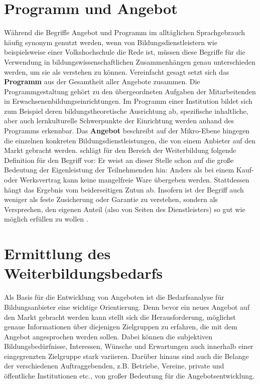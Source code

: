 \documentclass[
  twoside,
  parskip=half-,
  paper=176mm:246mm,
  BCOR=14mm,
  DIV=14,
]{scrreprt}
\begin{document}
\section{Programm und Angebot} Während die Begriffe Angebot und Programm im alltäglichen Sprachgebrauch häufig synonym genutzt werden, wenn von Bildungsdienstleistern wie beispielsweise einer Volkshochschule die Rede ist, müssen diese Begriffe für die Verwendung in bildungswissenschaftlichen Zusammenhängen genau unterschieden werden, um sie als  verstehen zu können. Vereinfacht gesagt setzt sich das \textbf{Programm} aus der Gesamtheit aller Angebote zusammen. Die Programmgestaltung gehört zu den übergeordneten Aufgaben der Mitarbeitenden in Erwachsenenbildungseinrichtungen. Im Programm einer Institution bildet sich zum Beispiel deren bildungstheoretische Ausrichtung ab, spezifische inhaltliche, aber auch lernkulturelle Schwerpunkte der Einrichtung werden anhand des Programms erkennbar. Das \textbf{Angebot} beschreibt auf der Mikro-Ebene hingegen die einzelnen konkreten Bildungsdienstleistungen, die von einem Anbieter auf den Markt gebracht werden. \citeauthor{schlutz} schlägt für den Bereich der Weiterbildung folgende Definition für den Begriff  vor:
 Er weist an dieser Stelle schon auf die große Bedeutung der Eigenleistung der Teilnehmenden hin: Anders als bei einem Kauf- oder Werksvertrag kann keine mangelfreie Ware übergeben werden. Stattdessen hängt das Ergebnis vom beiderseitigen Zutun ab. Insofern ist der Begriff  auch weniger als feste Zusicherung oder Garantie zu verstehen, sondern als Versprechen, den eigenen Anteil (also von Seiten des Dienstleisters) so gut wie möglich erfüllen zu wollen \autocite[vgl. auch][129]{fleige}.

\section{Ermittlung des Weiterbildungsbedarfs}

Als Basis für die Entwicklung von Angeboten ist die Bedarfsanalyse für Bildungsanbieter eine wichtige Orientierung. Denn bevor ein neues Angebot auf den Markt gebracht werden kann stellt sich die Herausforderung, möglichst genaue Informationen über diejenigen Zielgruppen zu erfahren, die mit dem Angebot angesprochen werden sollen. Dabei können die subjektiven Bildungsbedürfnisse, Interessen, Wünsche und Erwartungen auch innerhalb einer eingegrenzten Zielgruppe stark variieren. Darüber hinaus sind auch die Belange der verschiedenen Auftraggebenden, z.B. Betriebe, Vereine, private und öffentliche Institutionen etc., von großer Bedeutung für die Angebotsentwicklung.
\end{document}
